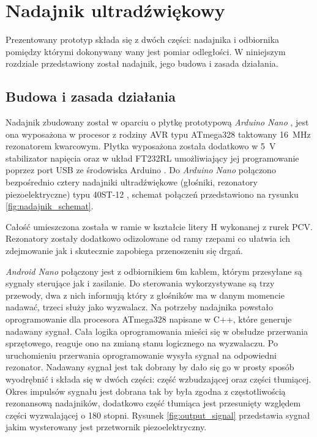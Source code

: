 \chapter{Nadajnik ultradźwiękowy}

Prezentowany prototyp składa się z dwóch części: nadajnika i odbiornika pomiędzy którymi
dokonywany wany jest pomiar odległości. W niniejszym rozdziale przedstawiony został nadajnik, 
jego budowa i zasada działania.


\section{Budowa i zasada działania}

Nadajnik zbudowany został w oparciu o płytkę prototypową \textit{Arduino Nano} \cite{bib:arduinoNano},
jest ona wyposażona w procesor z rodziny AVR typu ATmega328 \cite{bib:atmega328} taktowany \SI{16}{MHz} rezonatorem kwarcowym.
Płytka wyposażona została  dodatkowo w \SI{5}{V} stabilizator napięcia oraz w układ FT232RL umożliwiający 
jej programowanie poprzez port USB ze środowiska Arduino \cite{bib:Arduino}. 
Do \textit{Arduino Nano} połączono 
bezpośrednio cztery nadajniki ultradźwiękowe (głośniki, rezonatory piezoelektryczne) typu 40ST-12 \cite{bib:40ST12}, schemat 
połączeń przedstawiono na rysunku \ref{fig:nadajnik_schemat}.



Całość umieszczona została w ramie w kształcie litery H wykonanej z rurek PCV.
Rezonatory zostały dodatkowo odizolowane od ramy rzepami co ułatwia ich zdejmowanie jak i skutecznie
zapobiega przenoszeniu się drgań.



\textit{Android Nano} połączony jest z odbiornikiem 6m kablem, którym przesyłane są sygnały sterujące jak i zasilanie.
Do sterowania wykorzystywane są trzy przewody, dwa z nich informują który z głośników ma w danym momencie nadawać,
trzeci służy jako wyzwalacz. 
Na potrzeby nadajnika powstało oprogramowanie dla procesora ATmega328 napisane w C++, które generuje nadawany sygnał.
Cała logika oprogramowania mieści się w obsłudze przerwania sprzętowego, reaguje ono na zmianą stanu logicznego
na wyzwalaczu.
Po uruchomieniu przerwania oprogramowanie wysyła sygnał na odpowiedni rezonator. 
Nadawany sygnał jest tak dobrany by dało się go w prosty sposób wyodrębnić i składa się w dwóch
części: część wzbudzającej oraz części tłumiącej.
Okres impulsów sygnału jest dobrana tak by była zgodna z częstotliwością rezonansową nadajników, dodatkowo część tłumiąca
jest przesunięty względem części wyzwalającej o 180 stopni.  
Rysunek \ref{fig:output_signal} przedstawia sygnał jakim wysterowany jest przetwornik piezoelektryczny. 


